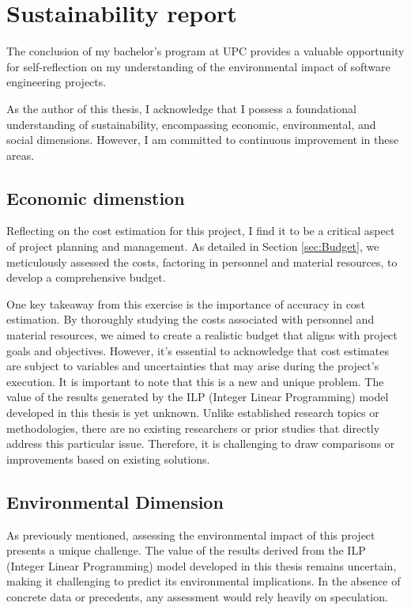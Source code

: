 \section{Sustainability report}

The conclusion of my bachelor's program at UPC provides a valuable opportunity for self-reflection on my understanding of the environmental impact of software engineering projects.

As the author of this thesis, I acknowledge that I possess a foundational understanding of sustainability, encompassing economic, environmental, and social dimensions. However, I am committed to continuous improvement in these areas.

\subsection{Economic dimenstion}
Reflecting on the cost estimation for this project, I find it to be a critical aspect of project planning and management. As detailed in Section \ref{sec:Budget}, we meticulously assessed the costs, factoring in personnel and material resources, to develop a comprehensive budget.

One key takeaway from this exercise is the importance of accuracy in cost estimation. By thoroughly studying the costs associated with personnel and material resources, we aimed to create a realistic budget that aligns with project goals and objectives. However, it's essential to acknowledge that cost estimates are subject to variables and uncertainties that may arise during the project's execution.
It is important to note that this is a new and unique problem. The value of the results generated by the ILP (Integer Linear Programming) model developed in this thesis is yet unknown. Unlike established research topics or methodologies, there are no existing researchers or prior studies that directly address this particular issue. Therefore, it is challenging to draw comparisons or improvements based on existing solutions.

\subsection{Environmental Dimension}
As previously mentioned, assessing the environmental impact of this project presents a unique challenge. The value of the results derived from the ILP (Integer Linear Programming) model developed in this thesis remains uncertain, making it challenging to predict its environmental implications. In the absence of concrete data or precedents, any assessment would rely heavily on speculation.

